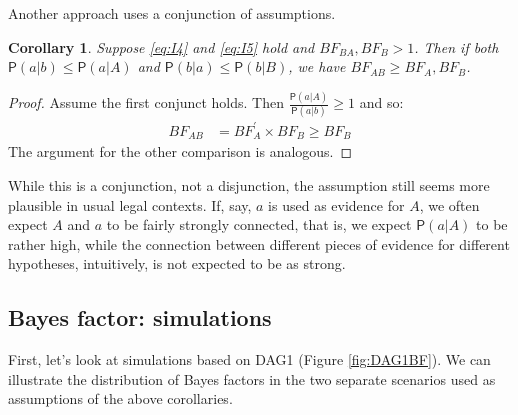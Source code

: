 \documentclass[
  10pt,
  dvipsnames,enabledeprecatedfontcommands]{scrartcl}
\newcommand{\pr}[1]{\ensuremath{\mathsf{P}(#1)}}
\newtheorem{corollary}{Corollary}[fact]
\begin{document}
Another approach uses a conjunction of assumptions.

\begin{corollary} Suppose \eqref{eq:I4} and \eqref{eq:I5}  hold and $BF_{BA}, BF_{B} >1$. 
Then if both $\pr{a\vert b} \leq \pr{a \vert A}$ and \linebreak  $\pr{b \vert a} \leq \pr{b\vert B}$, we have $BF_{AB}\geq BF_{A}, BF_{B}$. \label{cor:BFweaker2}
\end{corollary}

\begin{proof}
Assume the first conjunct holds. Then $\frac{\pr{a\vert A}}{\pr{a\vert b}} \geq 1$ and so:
\begin{align*}
BF_{AB} &= BF^{'}_{A} \times BF_{B} \geq BF_{B}
\end{align*}
\noindent The argument for the other comparison is analogous.
\end{proof}

While this is a conjunction, not a disjunction, the assumption still
seems more plausible in usual legal contexts. If, say, \(a\) is used as
evidence for \(A\), we often expect \(A\) and \(a\) to be fairly
strongly connected, that is, we expect \(\pr{a\vert A}\) to be rather
high, while the connection between different pieces of evidence for
different hypotheses, intuitively, is not expected to be as strong.

\hypertarget{bayes-factor-simulations}{%
\subsection*{Bayes factor: simulations}\label{bayes-factor-simulations}}

First, let's look at simulations based on \textsf{DAG1} (Figure
\ref{fig:DAG1BF}). We can illustrate the distribution of Bayes factors
in the two separate scenarios used as assumptions of the above
corollaries.

\vspace{1mm}
\footnotesize

\normalsize
\end{document}
